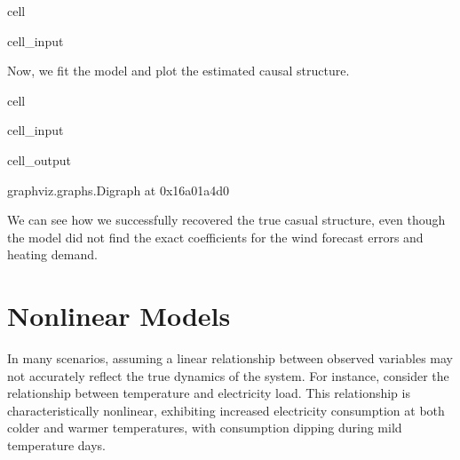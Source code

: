 \documentclass[letterpaper,10pt,english]{jupyterBook}
\begin{document}
\begin{sphinxuseclass}{cell}
\begin{sphinxVerbatimInput}
\begin{sphinxuseclass}{cell_input}
\end{sphinxuseclass}\end{sphinxVerbatimInput}

\end{sphinxuseclass}
\sphinxAtStartPar
Now, we fit the  model and plot the estimated causal structure.

\begin{sphinxuseclass}{cell}\begin{sphinxVerbatimInput}

\begin{sphinxuseclass}{cell_input}
\begin{sphinxVerbatim}[commandchars=\\\{\}]
 

  
 
\end{sphinxVerbatim}

\end{sphinxuseclass}\end{sphinxVerbatimInput}
\begin{sphinxVerbatimOutput}

\begin{sphinxuseclass}{cell_output}
\begin{sphinxVerbatim}[commandchars=\\\{\}]
\PYGZlt{}graphviz.graphs.Digraph at 0x16a01a4d0\PYGZgt{}
\end{sphinxVerbatim}

\end{sphinxuseclass}\end{sphinxVerbatimOutput}

\end{sphinxuseclass}
\sphinxAtStartPar
We can see how we successfully recovered the true casual structure, even though the model did not find the exact coefficients for the wind forecast errors and heating demand.

\sphinxstepscope


\chapter{Nonlinear Models}
\label{\detokenize{notebooks/semiparametric_resit:nonlinear-models}}\label{\detokenize{notebooks/semiparametric_resit::doc}}
\sphinxAtStartPar
In many scenarios, assuming a linear relationship between observed variables may not accurately reflect the true dynamics of the system. For instance, consider the relationship between temperature and electricity load. This relationship is characteristically nonlinear, exhibiting increased electricity consumption at both colder and warmer temperatures, with consumption dipping during mild temperature days.
\end{document}
